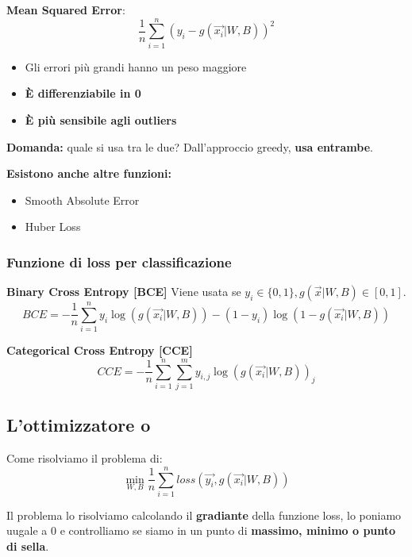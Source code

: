 \textbf{Mean Squared Error}:
\begin{equation}
    \frac{1}{n} \sum_{i=1}^n (y_i - g(\vec{x_i}|W,B))^2
\end{equation}

\begin{itemize}
    \item Gli errori più grandi hanno un peso maggiore
    \item \textbf{È differenziabile in 0}
    \item \textbf{È più sensibile agli outliers}
\end{itemize}

\textbf{Domanda:} quale si usa tra le due? Dall'approccio greedy, \textbf{usa entrambe}.

\textbf{Esistono anche altre funzioni:}
\begin{itemize}
    \item Smooth Absolute Error
    \item Huber Loss
\end{itemize}

\subsubsection{Funzione di loss per classificazione}

\textbf{Binary Cross Entropy [BCE]}
Viene usata se $y_i \in \{0,1\}, g(\vec{x}|W,B) \in [0,1]$.
\begin{equation}
    BCE = -\frac{1}{n} \sum_{i=1}^n y_i \log(g(\vec{x_i}|W,B)) - (1-y_i)\log(1-g(\vec{x_i}|W,B))
\end{equation}

\textbf{Categorical Cross Entropy [CCE]}
\begin{equation}
    CCE = -\frac{1}{n} \sum_{i=1}^n \sum_{j=1}^m y_{i,j} \log(g(\vec{x_i}|W,B))_j
\end{equation}
\subsection{L'ottimizzatore o}
Come risolviamo il problema di:
\begin{equation}
    \min_{W,B} \frac{1}{n} \sum_{i=1}^n loss(\vec{y_i}, g(\vec{x_i}|W,B))
\end{equation}

Il problema lo risolviamo calcolando il \textbf{gradiante} della funzione loss,
lo poniamo uugale a 0 e controlliamo se siamo in un punto di \textbf{massimo,
    minimo o punto di sella}.

